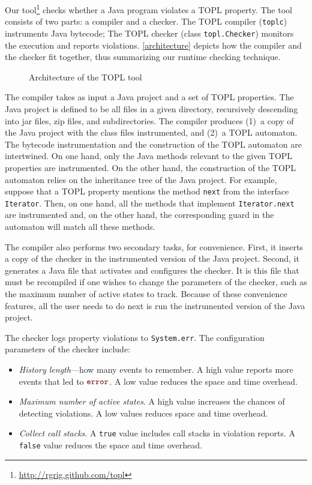 \documentclass[10pt, preprint]{sigplanconf} %
\newcommand{\error}{\ensuremath{\textcolor{darkred}{\mathtt{error}}}\xspace}
\begin{document}
Our tool\footnote{\url{http://rgrig.github.com/topl}} checks whether a Java program violates a TOPL property.
The tool consists of two parts: a compiler and a checker.
The TOPL compiler ({\tt toplc}) instruments Java bytecode;
The TOPL checker (class {\tt topl.Checker}) monitors the execution and reports violations.
\autoref{architecture} depicts how the compiler and the checker fit together, thus summarizing our runtime checking technique.

\begin{figure*}[t]
\begin{center}

\caption{Architecture of the TOPL tool}
\label{architecture}
\end{center}
\end{figure*}

The compiler takes as input a Java project and a set of TOPL properties.
The Java project is defined to be all files in a given directory, recursively descending into jar files, zip files, and subdirectories.
The compiler produces (1)~a copy of the Java project with the class files instrumented, and (2)~a TOPL automaton.
The bytecode instrumentation and the construction of the TOPL automaton are intertwined.
On one hand, only the Java methods relevant to the given TOPL properties are instrumented.
On the other hand, the construction of the TOPL automaton relies on the inheritance tree of the Java project.
For example, suppose that a TOPL property mentions the method {\tt next} from the interface {\tt Iterator}.
Then, on one hand, all the methods that implement {\tt Iterator.next} are instrumented and, on the other hand, the corresponding guard in the automaton will match all these methods.

The compiler also performs two secondary tasks, for convenience.
First, it inserts a copy of the checker in the instrumented version of the Java project.
Second, it generates a Java file that activates and configures the checker.
It is this file that must be recompiled if one wishes to change the parameters of the checker, such as the maximum number of active states to track.
Because of these convenience features, all the user needs to do next is run the instrumented version of the Java project.

The checker logs property violations to {\tt System.err}.
The configuration parameters of the checker include:
\begin{itemize}
\item \emph{History length}---how many events to remember.
  A high value reports more events that led to \error.
  A low value reduces the space and time overhead.
\item \emph{Maximum number of active states}.
  A high value increases the chances of detecting violations.
  A low values reduces space and time overhead.
\item \emph{Collect call stacks}.
  A {\tt true} value includes call stacks in violation reports.
  A {\tt false} value reduces the space and time overhead.
\end{itemize}
\end{document}
